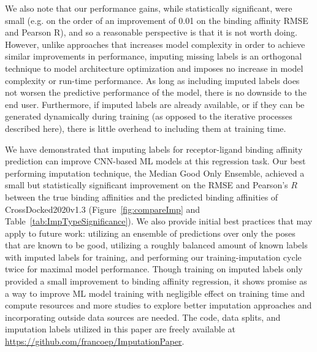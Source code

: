 \documentclass[journal=jcim,manuscript=article]{achemso}
\begin{document}
We also note that our performance gains, while statistically significant, were small (e.g. on the order of an improvement of 0.01 on the binding affinity RMSE and Pearson R), and so a reasonable perspective is that it is not worth doing. 
However, unlike approaches that increases model complexity in order to achieve similar improvements in performance,\cite{crossdocked2020,bapa,fusionAff,pafnuncy,kdeep,onionnet} imputing missing labels is an orthogonal technique to model architecture optimization and imposes no increase in model complexity or run-time performance. 
As long as including imputed labels does not worsen the predictive performance of the model, there is no downside to the end user. 
Furthermore, if imputed labels are already available, or if they can be generated dynamically during training (as opposed to the iterative processes described here), there is little overhead to including them at training time.


We have demonstrated that imputing labels for receptor-ligand binding affinity prediction can improve CNN-based ML models at this regression task.
Our best performing imputation technique, the Median Good Only Ensemble, achieved a small but statistically significant improvement on the RMSE and Pearson's $R$ between the true binding affinities and the predicted binding affinities of CrossDocked2020v1.3 (Figure~\ref{fig:compareImp} and Table~\ref{tab:ImpTypeSignificance}).
We also provide initial best practices that may apply to future work: utilizing an ensemble of predictions over only the poses that are known to be good, utilizing a roughly balanced amount of known labels with imputed labels for training, and performing our training-imputation cycle twice for maximal model performance.
Though training on imputed labels only provided a small improvement to binding affinity regression, it shows promise as a way to improve ML model training with negligible effect on training time and compute resources and more studies to explore better imputation approaches and incorporating outside data sources are needed.
The code, data splits, and imputation labels utilized in this paper are freely available at \url{https://github.com/francoep/ImputationPaper}.
\end{document}

